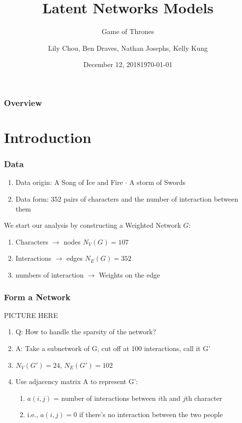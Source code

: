 \documentclass[handout]{beamer}
\title{Latent Networks Models}
\subtitle{Game of Thrones}
\author{Lily Chou, Ben Draves, Nathan Josephs, Kelly Kung}
\date{December 12, 2018}
\institute[Boston University] 
{
  Department of Mathematics and Statistics\\
  Boston University
  }
\date{\today}
\begin{document}
%
%
\begin{frame}
  \titlepage
\end{frame}
\begin{frame}
\frametitle{Overview}
\tableofcontents
\end{frame}

\section{Introduction}
\begin{frame}
 \frametitle{Data}
\begin{enumerate}
\item Data origin: A Song of Ice and Fire $\cdot$ A storm of Swords
\item Data form: 352 pairs of characters and the number of interaction between them
\end{enumerate}

We start our analysis by constructing a Weighted Network $G$: 
\begin{enumerate}[i]
\item Characters $\rightarrow$ nodes 
\:  $N_V (G)= 107$
\item Interactions $\rightarrow$ edges   
\: $N_E (G) = 352$
\item numbers of interaction $\rightarrow$ Weights on the edge
\end{enumerate}
\end{frame}

\begin{frame}
\frametitle{Form a Network}
PICTURE HERE
\begin{enumerate}[a]
\item Q: How to handle the sparsity of the network? 
\item A: Take a subnetwork of G, cut off at 100 interactions, call it G'
\item $N_V (G')= 24$, $N_E (G') = 102$
\item Use adjacency matrix A to represent G': 
 \begin{enumerate}[i]
  \item $a(i, j)$ = number of interactions between $i$th and $j$th character
  \item  i.e., $a(i, j) = 0$ if there's no interaction between the two people
 \end{enumerate}
\end{enumerate}
\end{frame} 
\end{document}

